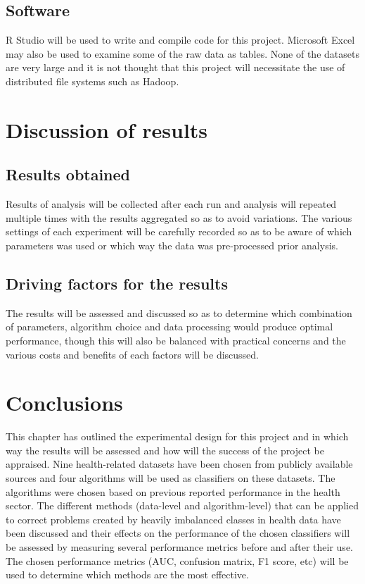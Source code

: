 \subsection{Software}

R Studio will be used to write and compile code for this project. Microsoft Excel may also be used to examine some of the raw data as tables. 
None of the datasets are very large and it is not thought that this project will necessitate the use of distributed file systems such as Hadoop.

\section{Discussion of results}
\subsection{Results obtained}
Results of analysis will be collected after each run and analysis will repeated multiple times with the results aggregated so as to avoid variations.
The various settings of each experiment will be carefully recorded so as to be aware of which parameters was used or which way the data was pre-processed prior analysis.

\subsection{Driving factors for the results}
The results will be assessed and discussed so as to determine which combination of parameters, algorithm choice and data processing would produce optimal performance, though this will also be balanced with practical concerns and the various costs and benefits of each factors will be discussed.


\section{Conclusions}

This chapter has outlined the experimental design for this project and in which way the results will be assessed and how will the success of the project be appraised. 
Nine health-related datasets have been chosen from publicly available sources and four algorithms will be used as classifiers on these datasets. The algorithms were chosen based on previous reported performance in the health sector. The different methods (data-level and algorithm-level) that can be applied to correct problems created by heavily imbalanced classes in health data have been discussed and their effects on the performance of the chosen classifiers will be assessed by measuring several performance metrics before and after their use.
The chosen performance metrics (AUC, confusion matrix, F1 score, etc) will be used to determine which methods are the most effective.





